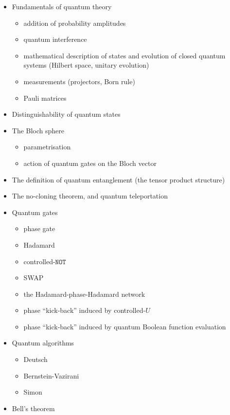 \documentclass[fleqn]{article}
\providecommand{\tightlist}{%
  \setlength{\itemsep}{0pt}\setlength{\parskip}{0pt}}
\begin{document}
\begin{itemize}
\tightlist
\item
  Fundamentals of quantum theory

  \begin{itemize}
  \tightlist
  \item
    addition of probability amplitudes
  \item
    quantum interference
  \item
    mathematical description of states and evolution of closed quantum systems (Hilbert space, unitary evolution)
  \item
    measurements (projectors, Born rule)
  \item
    Pauli matrices
  \end{itemize}
\item
  Distinguishability of quantum states
\item
  The Bloch sphere

  \begin{itemize}
  \tightlist
  \item
    parametrisation
  \item
    action of quantum gates on the Bloch vector
  \end{itemize}
\item
  The definition of quantum entanglement (the tensor product structure)
\item
  The no-cloning theorem, and quantum teleportation
\item
  Quantum gates

  \begin{itemize}
  \tightlist
  \item
    phase gate
  \item
    Hadamard
  \item
    controlled-\(\texttt{NOT}\)
  \item
    SWAP
  \item
    the Hadamard-phase-Hadamard network
  \item
    phase ``kick-back'' induced by controlled-\(U\)
  \item
    phase ``kick-back'' induced by quantum Boolean function evaluation
  \end{itemize}
\item
  Quantum algorithms

  \begin{itemize}
  \tightlist
  \item
    Deutsch
  \item
    Bernstein-Vazirani
  \item
    Simon
  \end{itemize}
\item
  Bell's theorem


\end{itemize}
\end{document}
